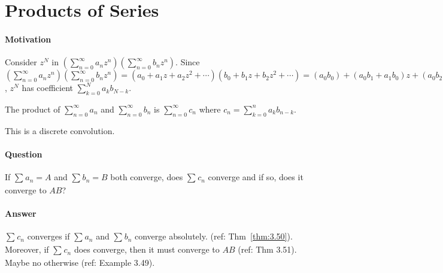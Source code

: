 \section{Products of Series}
\paragraph{Motivation}
Consider $z^{N}$ in $(\sum_{n=0}^{\infty}{a_{n}z^{n}})(\sum_{n=0}^{\infty}{b_{n}z^{n}})$.
Since $(\sum_{n=0}^{\infty}{a_{n}z^{n}})(\sum_{n=0}^{\infty}{b_{n}z^{n}})
	=(a_0+a_1z+a_2z^2+\cdots)(b_0+b_1z+b_2z^2+\cdots)=(a_0b_0)+(a_0b_1+a_1b_0)z+(a_0b_2+a_1b_1+a_2b_0)z^2+\cdots$, $z^{N}$ has coefficient $\sum_{k=0}^{N}{a_kb_{N-k}}$.
\begin{definition}
	The product of $\sum_{n=0}^{\infty}{a_{n}}$ and $\sum_{n=0}^{\infty}{b_{n}}$ is $\sum_{n=0}^{\infty}{c_{n}}$ where $c_{n}=\sum_{k=0}^{n}{a_kb_{n-k}}$.
	\begin{note}
		This is a discrete convolution.
	\end{note}
\end{definition}

\paragraph{Question}
If $\sum_{}{a_{n}}=A$ and $\sum_{}{b_{n}}=B$ both converge, does $\sum_{}{c_{n}}$ converge and if so, does it converge to $AB$?
\paragraph{Answer}
$\sum_{}{c_{n}}$ converges if $\sum_{}{a_{n}}$ and $\sum_{}{b_{n}}$ converge absolutely. (ref: Thm~\ref{thm:3.50}). Moreover, if $\sum_{}{c_{n}}$ does converge, then it must converge to $AB$ (ref: Thm 3.51). Maybe no otherwise (ref: Example 3.49).


